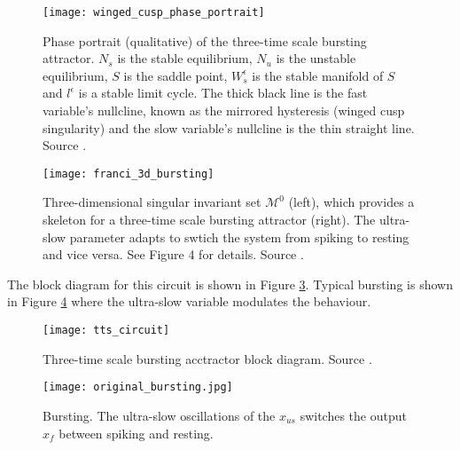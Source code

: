 \documentclass[a4paper, 12pt]{article}
\begin{document}
\begin{figure}[h!]
\texttt{[image: winged\_cusp\_phase\_portrait]}
\caption{Phase portrait (qualitative) of the three-time scale bursting attractor. $N_s$ is the stable equilibrium, $N_u$ is the unstable equilibrium, $S$ is the saddle point, $W_s^\epsilon$ is the stable manifold of $S$ and $l^\epsilon$ is a stable limit cycle. The thick black line is the fast variable's nullcline, known as the mirrored hysteresis (winged cusp singularity) and the slow variable's nullcline is the thin straight line. Source \cite{franci2}.}
\label{fig:bursting_fundamental_phase_portait}
\end{figure}

\begin{figure}
\texttt{[image: franci\_3d\_bursting]}
\caption{Three-dimensional singular invariant set $\mathcal{M}^0$ (left), which provides a skeleton for a three-time scale bursting attractor (right). The ultra-slow parameter adapts to swtich the system from spiking to resting and vice versa. See \cite{franci2} Figure 4 for details. Source \cite{franci2}.}
\label{fig:3d_bursting}
\end{figure}

The block diagram for this circuit is shown in Figure \ref{fig:ttsbursting_circuit}. Typical bursting is shown in Figure \ref{fig:bursting_typical_oscillations} where the ultra-slow variable modulates the behaviour.

\begin{figure}
\texttt{[image: tts\_circuit]}
\caption{Three-time scale bursting acctractor block diagram. Source \cite{franci}.}
\label{fig:ttsbursting_circuit}
\end{figure}

 \begin{figure}
\texttt{[image: original\_bursting.jpg]}
\caption{Bursting. The ultra-slow oscillations of the $x_{us}$ switches the output $x_f$ between spiking and resting.}
\label{fig:bursting_typical_oscillations}
\end{figure}
\end{document}
